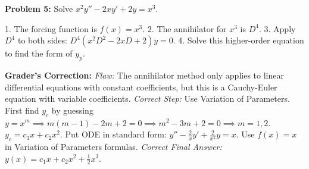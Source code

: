 \documentclass[11pt]{article}
\begin{document}
\vspace{0.5cm}
\textbf{Problem 5:} Solve $x^2 y'' - 2x y' + 2y = x^3$.
\begin{tcolorbox}[colback=red!5,colframe=red!40!black,title=Flawed Solution]
1. The forcing function is $f(x) = x^3$.
2. The annihilator for $x^3$ is $D^4$.
3. Apply $D^4$ to both sides: $D^4(x^2 D^2 - 2x D + 2)y = 0$.
4. Solve this higher-order equation to find the form of $y_p$.
\end{tcolorbox}
\textbf{Grader's Correction:}
\textit{Flaw:} The annihilator method only applies to linear differential equations with constant coefficients, but this is a Cauchy-Euler equation with variable coefficients.
\textit{Correct Step:} Use Variation of Parameters. First find $y_c$ by guessing $y = x^m \implies m(m-1) - 2m + 2 = 0 \implies m^2 - 3m + 2 = 0 \implies m=1, 2$. $y_c = c_1 x + c_2 x^2$. Put ODE in standard form: $y'' - \frac{2}{x}y' + \frac{2}{x^2}y = x$. Use $f(x) = x$ in Variation of Parameters formulas.
\textit{Correct Final Answer:} $y(x) = c_1 x + c_2 x^2 + \frac{1}{2} x^3$.
\end{document}
